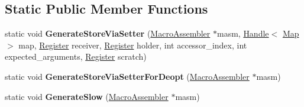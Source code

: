 \subsection*{Static Public Member Functions}
\begin{DoxyCompactItemize}
\item 
static void {\bfseries Generate\+Store\+Via\+Setter} (\hyperlink{classv8_1_1internal_1_1_macro_assembler}{Macro\+Assembler} $\ast$masm, \hyperlink{classv8_1_1internal_1_1_handle}{Handle}$<$ \hyperlink{classv8_1_1internal_1_1_map}{Map} $>$ map, \hyperlink{structv8_1_1internal_1_1_register}{Register} receiver, \hyperlink{structv8_1_1internal_1_1_register}{Register} holder, int accessor\+\_\+index, int expected\+\_\+arguments, \hyperlink{structv8_1_1internal_1_1_register}{Register} scratch)\hypertarget{classv8_1_1internal_1_1_named_store_handler_compiler_a45c4ed20706f0b8f497b863ac82c18c9}{}\label{classv8_1_1internal_1_1_named_store_handler_compiler_a45c4ed20706f0b8f497b863ac82c18c9}

\item 
static void {\bfseries Generate\+Store\+Via\+Setter\+For\+Deopt} (\hyperlink{classv8_1_1internal_1_1_macro_assembler}{Macro\+Assembler} $\ast$masm)\hypertarget{classv8_1_1internal_1_1_named_store_handler_compiler_a072c53801d39146f40ab1a571d3ec287}{}\label{classv8_1_1internal_1_1_named_store_handler_compiler_a072c53801d39146f40ab1a571d3ec287}

\item 
static void {\bfseries Generate\+Slow} (\hyperlink{classv8_1_1internal_1_1_macro_assembler}{Macro\+Assembler} $\ast$masm)\hypertarget{classv8_1_1internal_1_1_named_store_handler_compiler_a4e6b0d617dc9dd30e6b6e0b90db002ab}{}\label{classv8_1_1internal_1_1_named_store_handler_compiler_a4e6b0d617dc9dd30e6b6e0b90db002ab}

\end{DoxyCompactItemize}
